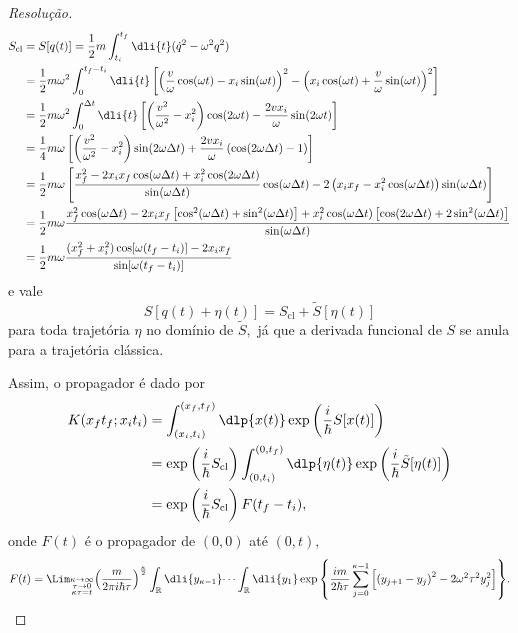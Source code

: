 \begin{proof}[Resolução]
\begin{align*}
      S_{\mathrm{cl}} &= S[q(t)] = \frac12 m\int_{t_i}^{t_f} \dli{t} (\dot{q}^2 - \omega^2 q^2)\\
                      &= \frac12 m\omega^2 \int_{0}^{t_f-t_i} \dli{t} \left[\left(\frac{v}{\omega} \cos(\omega t)- x_i \sin(\omega t)\right)^2 - \left(x_i \cos(\omega t) + \frac{v}{\omega} \sin(\omega t)\right)^2\right]\\
                      &= \frac12 m \omega^2 \int_{0}^{\Delta t} \dli{t} \left[\left(\frac{v^2}{\omega^2} - x_i^2\right) \cos(2 \omega t ) - \frac{2v x_i}{\omega} \sin(2 \omega t)\right]\\
                      &= \frac14 m \omega \left[\left(\frac{v^2}{\omega^2} - x_i^2\right) \sin(2 \omega \Delta t) + \frac{2 v x_i}{\omega} \left(\cos(2 \omega \Delta t) - 1\right)\right]\\
                      &= \frac12 m \omega \left[\frac{x_f^2 - 2x_i x_f \cos(\omega \Delta t) + x_i^2 \cos(2 \omega \Delta t)}{\sin(\omega \Delta t)}\cos(\omega \Delta t) - 2\left(x_i x_f - x_i^2 \cos(\omega \Delta t)\right)\sin(\omega \Delta t)\right]\\
                      &= \frac12 m \omega \frac{x_f^2 \cos(\omega \Delta t) - 2x_i x_f \left[\cos^2(\omega \Delta t) + \sin^2(\omega \Delta t)\right] + x_i^2 \cos(\omega \Delta t) \left[\cos(2 \omega \Delta t) +2\sin^2(\omega \Delta t)\right]}{\sin(\omega \Delta t)}\\
                      &= \frac12 m \omega \frac{(x_f^2 + x_i^2) \cos[\omega (t_f - t_i)] - 2x_i x_f}{\sin[\omega (t_f - t_i)]}
   \end{align*}
   e vale
   \begin{equation*}
      S[q(t) + \eta(t)] = S_{\mathrm{cl}} + \tilde{S}[\eta(t)]
   \end{equation*}
   para toda trajetória \(\eta\) no domínio de \(\tilde{S},\) já que a derivada funcional de \(S\) se anula para a trajetória clássica.

   Assim, o propagador é dado por
   \begin{align*}
      K(x_ft_f; x_it_i) &= \int_{(x_i,t_i)}^{(x_f, t_f)} \dlp{x(t)} \exp\left(\frac{i}{\hbar}S[x(t)]\right)\\
                        &= \exp\left(\frac{i}{\hbar} S_{\mathrm{cl}}\right)\int_{(0, t_i)}^{(0, t_f)} \dlp{\eta(t)} \exp\left(\frac{i}{\hbar} \tilde{S}[\eta(t)]\right)\\
                        &=\exp\left(\frac{i}{\hbar} S_{\mathrm{cl}}\right) F(t_f - t_i),
   \end{align*}
   onde \(F(t)\) é o propagador de \((0,0)\) até \((0,t),\)
   \begin{equation*}
      F(t) = \Lim_{\substack{\kappa \to \infty\\ \tau \to 0\\ \kappa \tau = t}}{\left(\frac{m}{2\pi i \hbar \tau}\right)^{\frac\kappa2}\int_{\mathbb{R}} \dli{y_{\kappa - 1}} \dots \int_{\mathbb{R}} \dli{y_1} \exp\left\{\frac{i m}{ 2 \hbar \tau} \sum_{j = 0}^{\kappa - 1} \left[\left(y_{j+1} - y_j\right)^2 - 2\omega^2\tau^2 y_j^2\right]\right\}}.
   \end{equation*}


\end{proof}

